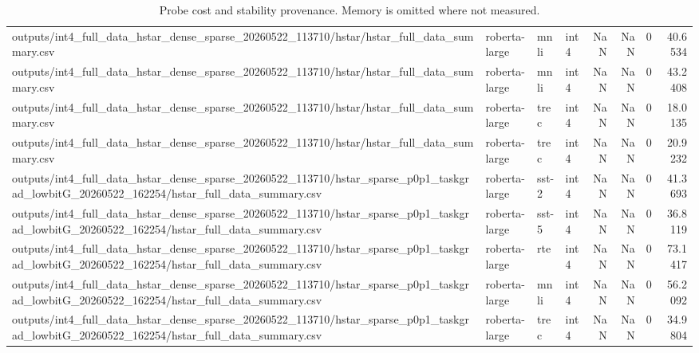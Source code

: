 \begin{table}[t]
\begin{tabular}{llllrrrr}
outputs/int4\_full\_data\_hstar\_dense\_sparse\_20260522\_113710/hstar/hstar\_full\_data\_summary.csv & roberta-large & mnli & int4 & NaN & NaN & 0 & 40.6534 \\
outputs/int4\_full\_data\_hstar\_dense\_sparse\_20260522\_113710/hstar/hstar\_full\_data\_summary.csv & roberta-large & mnli & int4 & NaN & NaN & 0 & 43.2408 \\
outputs/int4\_full\_data\_hstar\_dense\_sparse\_20260522\_113710/hstar/hstar\_full\_data\_summary.csv & roberta-large & trec & int4 & NaN & NaN & 0 & 18.0135 \\
outputs/int4\_full\_data\_hstar\_dense\_sparse\_20260522\_113710/hstar/hstar\_full\_data\_summary.csv & roberta-large & trec & int4 & NaN & NaN & 0 & 20.9232 \\
outputs/int4\_full\_data\_hstar\_dense\_sparse\_20260522\_113710/hstar\_sparse\_p0p1\_taskgrad\_lowbitG\_20260522\_162254/hstar\_full\_data\_summary.csv & roberta-large & sst-2 & int4 & NaN & NaN & 0 & 41.3693 \\
outputs/int4\_full\_data\_hstar\_dense\_sparse\_20260522\_113710/hstar\_sparse\_p0p1\_taskgrad\_lowbitG\_20260522\_162254/hstar\_full\_data\_summary.csv & roberta-large & sst-5 & int4 & NaN & NaN & 0 & 36.8119 \\
outputs/int4\_full\_data\_hstar\_dense\_sparse\_20260522\_113710/hstar\_sparse\_p0p1\_taskgrad\_lowbitG\_20260522\_162254/hstar\_full\_data\_summary.csv & roberta-large & rte & int4 & NaN & NaN & 0 & 73.1417 \\
outputs/int4\_full\_data\_hstar\_dense\_sparse\_20260522\_113710/hstar\_sparse\_p0p1\_taskgrad\_lowbitG\_20260522\_162254/hstar\_full\_data\_summary.csv & roberta-large & mnli & int4 & NaN & NaN & 0 & 56.2092 \\
outputs/int4\_full\_data\_hstar\_dense\_sparse\_20260522\_113710/hstar\_sparse\_p0p1\_taskgrad\_lowbitG\_20260522\_162254/hstar\_full\_data\_summary.csv & roberta-large & trec & int4 & NaN & NaN & 0 & 34.9804 \\
\bottomrule
\end{tabular}

\caption{Probe cost and stability provenance. Memory is omitted where not measured.}
\label{tab:probe_cost}
\end{table}

